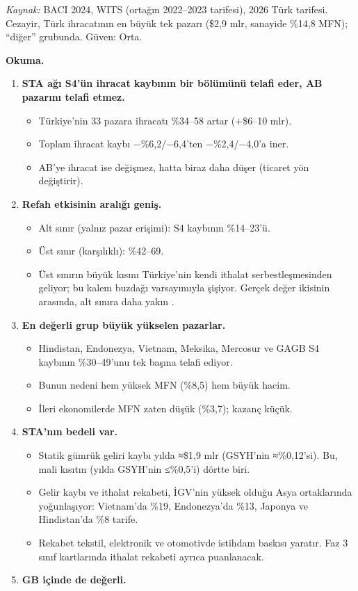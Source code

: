\endgroup

\emph{Kaynak:} \etiketT{} BACI 2024, WITS (ortağın 2022--2023 tarifesi), 2026 Türk tarifesi. Cezayir, Türk ihracatının en büyük tek pazarı (\$2,9 mlr, sanayide \%14,8 MFN); ``diğer'' grubunda. Güven: Orta.

\textbf{Okuma.}

\begin{enumerate}
\def\labelenumi{\arabic{enumi}.}
\tightlist
\item
  \textbf{STA ağı S4'ün ihracat kaybının bir bölümünü telafi eder, AB pazarını telafi etmez.}

  \begin{itemize}
  \tightlist
  \item
    Türkiye'nin 33 pazara ihracatı \%34--58 artar (+\$6--10 mlr).
  \item
    Toplam ihracat kaybı −\%6,2/−6,4'ten −\%2,4/−4,0'a iner.
  \item
    AB'ye ihracat ise değişmez, hatta biraz daha düşer (ticaret yön değiştirir).
  \end{itemize}
\item
  \textbf{Refah etkisinin aralığı geniş.}

  \begin{itemize}
  \tightlist
  \item
    Alt sınır (yalnız pazar erişimi): S4 kaybının \%14--23'ü.
  \item
    Üst sınır (karşılıklı): \%42--69.
  \item
    Üst sınırın büyük kısmı Türkiye'nin kendi ithalat serbestleşmesinden geliyor; bu kalem buzdağı varsayımıyla şişiyor. Gerçek değer ikisinin arasında, alt sınıra daha yakın \etiketH{}.
  \end{itemize}
\item
  \textbf{En değerli grup büyük yükselen pazarlar.}

  \begin{itemize}
  \tightlist
  \item
    Hindistan, Endonezya, Vietnam, Meksika, Mercosur ve GAGB S4 kaybının \%30--49'unu tek başına telafi ediyor.
  \item
    Bunun nedeni hem yüksek MFN (\%8,5) hem büyük hacim.
  \item
    İleri ekonomilerde MFN zaten düşük (\%3,7); kazanç küçük.
  \end{itemize}
\item
  \textbf{STA'nın bedeli var.}

  \begin{itemize}
  \tightlist
  \item
    Statik gümrük geliri kaybı yılda ≈\$1,9 mlr (GSYH'nin ≈\%0,12'si). Bu, mali kısıtın (yılda GSYH'nin ≤\%0,5'i) dörtte biri.
  \item
    Gelir kaybı ve ithalat rekabeti, İGV'nin yüksek olduğu Asya ortaklarında yoğunlaşıyor: Vietnam'da \%19, Endonezya'da \%13, Japonya ve Hindistan'da \%8 tarife.
  \item
    Rekabet tekstil, elektronik ve otomotivde istihdam baskısı yaratır. Faz 3 sınıf kartlarında ithalat rekabeti ayrıca puanlanacak.
  \end{itemize}
\item
  \textbf{GB içinde de değerli.}


\end{enumerate}
